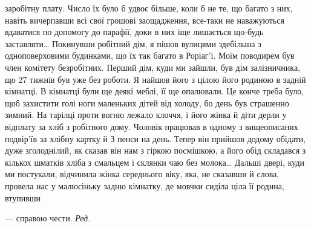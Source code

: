 заробітну плату. Число їх було б удвоє більше, коли б не те,
що багато з них, навіть вичерпавши всі свої грошові заощадження,
все-таки не наважуються вдаватися по допомогу до парафії,
доки в них іще лишається що-будь заставляти\dots{} Покинувши робітний
дім, я пішов вулицями здебільша з одноповерховими будинками,
що їх так багато в Роріаг’і. Моїм поводирем був член
комітету безробітних. Перший дім, куди ми зайшли, був дім
залізничника, що 27 тижнів був уже без роботи. Я найшов його
з цілою його родиною в задній кімнатці. В кімнатці були ще
деякі меблі, її ще опалювали. Це конче треба було, щоб захистити
голі ноги маленьких дітей від холоду, бо день був страшенно
зимний. На тарілці проти вогню лежало клоччя, і його жінка
й діти дерли у відплату за хліб з робітного дому. Чоловік працював
в одному з вищеописаних подвір’їв за хлібну картку й
З пенси на день. Тепер він прийшов додому обідати, дуже зголоднілий,
як сказав він нам з гіркою посмішкою, а його обід
складався з кількох шматків хліба з смальцем і склянки чаю
без молока\dots{} Дальші двері, куди ми постукали, відчинила жінка
середнього віку, яка, не сказавши й слова, провела нас у малюсіньку
задню кімнатку, де мовчки сиділа ціла її родина, втупивши

— справою чести. \emph{Ред.}
\parbreak{}  %
